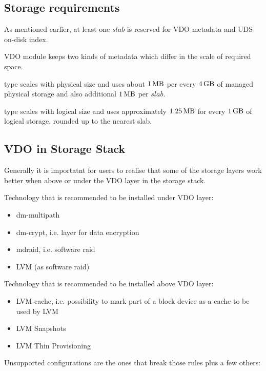 \documentclass[
  color, %
  table, %
  lof,   %
  lot,   %
]{fithesis3}
\begin{document}
\subsection{Storage requirements}
As mentioned earlier, at least one $slab$ is reserved for VDO metadata and UDS on-disk index.

VDO module keeps two kinds of metadata which differ in the scale of required space.
\begin{compactenum}
\item type scales with physical size and uses about $\SI{1}{\mega\byte}$ per every $\SI{4}{\giga\byte}$ of managed physical storage and also additional $\SI{1}{\mega\byte}$ per $slab$. 
\item type scales with logical size and uses approximately $\SI{1.25}{\mega\byte}$ for every $\SI{1}{\giga\byte}$ of logical storage, rounded up to the nearest slab.
\end{compactenum}

\subsection{VDO in Storage Stack}
\label{stack}
Generally it is importatnt for users to realise that some of the storage layers work better when above or under the VDO layer in the storage stack.

Technology that is recommended to be installed under VDO layer:

\begin{itemize}
  \item dm-multipath
  \item dm-crypt, i.e. layer for data encryption
  \item mdraid, i.e. software raid
  \item LVM (as software raid)
\end{itemize}

Technology that is recommended to be installed above VDO layer:

\begin{itemize}
  \item LVM cache, i.e. possibility to mark part of a block device as a cache to be used by LVM
  \item LVM Snapshots
  \item LVM Thin Provisioning
\end{itemize}

Unsupported configurations are the ones that break those rules plus a few others:
\end{document}
